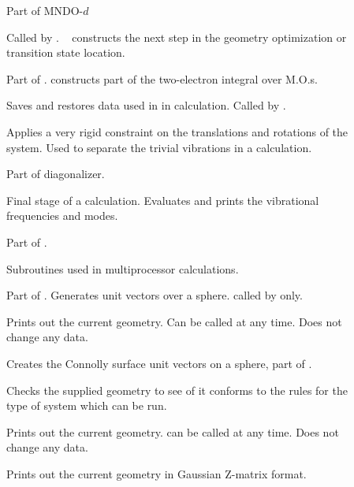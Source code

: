 \begin{description}
\item[] Part of MNDO-$d$

\item[] Called by . \  constructs the next
step in the geometry optimization or transition state location.

\item[] Part of .  constructs part of 
the two-electron integral over M.O.s.

\item[] Saves and restores data used in  in
  calculation. Called by .

\item[] Applies a very rigid constraint on the translations and
rotations of the system. Used to separate the trivial vibrations in a
 calculation.

\item[] Part of diagonalizer.

\item[] Final stage of a  calculation. Evaluates and
prints the vibrational frequencies and modes.

\item[] Part of .

\item[] Subroutines used in multiprocessor calculations.

\item[] Part of . Generates unit vectors over a sphere.
called by  only.

\item[] Prints out the current geometry. Can be called at  any
time. Does not change any data.

\item[] Creates the Connolly surface unit vectors on a sphere,
part of .

\item[] Checks the supplied geometry to see of it conforms
to the rules for the type of system which can be run.

\item[] Prints out the current geometry.  can be
called at any time. Does not change any data.

\item[] Prints out the current geometry in Gaussian
Z-matrix format.


\end{description}
